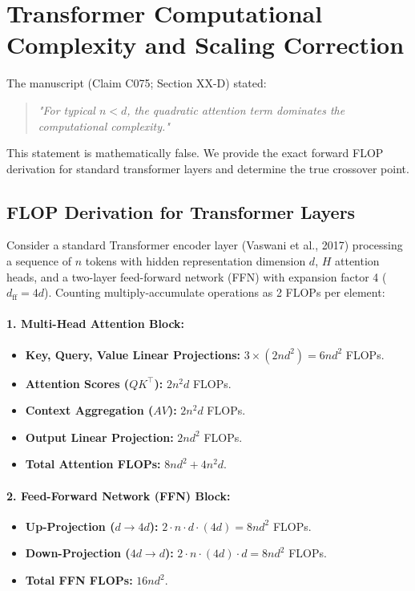 \section{Transformer Computational Complexity and Scaling Correction}
\label{sec:complexity}

The manuscript (Claim C075; Section XX-D) stated:
\begin{quote}
\emph{"For typical $n < d$, the quadratic attention term dominates the computational complexity."}
\end{quote}
This statement is mathematically false. We provide the exact forward FLOP derivation for standard transformer layers and determine the true crossover point.

\subsection{FLOP Derivation for Transformer Layers}
Consider a standard Transformer encoder layer (Vaswani et al., 2017) processing a sequence of $n$ tokens with hidden representation dimension $d$, $H$ attention heads, and a two-layer feed-forward network (FFN) with expansion factor 4 ($d_{\text{ff}} = 4d$). Counting multiply-accumulate operations as 2 FLOPs per element:

\paragraph{1. Multi-Head Attention Block:}
\begin{itemize}
    \item \textbf{Key, Query, Value Linear Projections:} $3 \times (2 n d^2) = 6 n d^2$ FLOPs.
    \item \textbf{Attention Scores ($Q K^\top$):} $2 n^2 d$ FLOPs.
    \item \textbf{Context Aggregation ($A V$):} $2 n^2 d$ FLOPs.
    \item \textbf{Output Linear Projection:} $2 n d^2$ FLOPs.
    \item \textbf{Total Attention FLOPs:} $8 n d^2 + 4 n^2 d$.
\end{itemize}

\paragraph{2. Feed-Forward Network (FFN) Block:}
\begin{itemize}
    \item \textbf{Up-Projection ($d \to 4d$):} $2 \cdot n \cdot d \cdot (4d) = 8 n d^2$ FLOPs.
    \item \textbf{Down-Projection ($4d \to d$):} $2 \cdot n \cdot (4d) \cdot d = 8 n d^2$ FLOPs.
    \item \textbf{Total FFN FLOPs:} $16 n d^2$.
\end{itemize}

